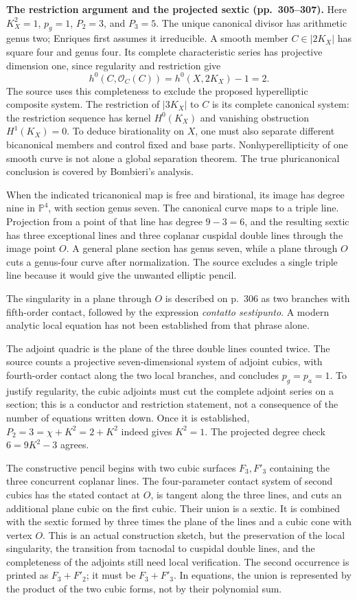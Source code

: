 \textbf{The restriction argument and the projected sextic (pp.~305--307).}
Here \(K_X^2=1\), \(p_g=1\), \(P_2=3\), and \(P_3=5\). The unique canonical divisor has arithmetic genus two; Enriques first assumes it irreducible. A smooth member \(C\in|2K_X|\) has square four and genus four. Its complete characteristic series has projective dimension one, since regularity and restriction give
\[
h^0(C,\mathcal O_C(C))=h^0(X,2K_X)-1=2.
\]
The source uses this completeness to exclude the proposed hyperelliptic composite system. The restriction of \(|3K_X|\) to \(C\) is its complete canonical system: the restriction sequence has kernel \(H^0(K_X)\) and vanishing obstruction \(H^1(K_X)=0\). To deduce birationality on \(X\), one must also separate different bicanonical members and control fixed and base parts. Nonhyperellipticity of one smooth curve is not alone a global separation theorem. The true pluricanonical conclusion is covered by Bombieri's analysis.

When the indicated tricanonical map is free and birational, its image has degree nine in \(\mathbb P^4\), with section genus seven. The canonical curve maps to a triple line. Projection from a point of that line has degree \(9-3=6\), and the resulting sextic has three exceptional lines and three coplanar cuspidal double lines through the image point \(O\). A general plane section has genus seven, while a plane through \(O\) cuts a genus-four curve after normalization. The source excludes a single triple line because it would give the unwanted elliptic pencil.

The singularity in a plane through \(O\) is described on p.~306 as two branches with fifth-order contact, followed by the expression \emph{contatto sestipunto}. A modern analytic local equation has not been established from that phrase alone.

The adjoint quadric is the plane of the three double lines counted twice. The source counts a projective seven-dimensional system of adjoint cubics, with fourth-order contact along the two local branches, and concludes \(p_g=p_a=1\). To justify regularity, the cubic adjoints must cut the complete adjoint series on a section; this is a conductor and restriction statement, not a consequence of the number of equations written down. Once it is established, \(P_2=3=\chi+K^2=2+K^2\) indeed gives \(K^2=1\). The projected degree check \(6=9K^2-3\) agrees.

The constructive pencil begins with two cubic surfaces \(F_3,F'_3\) containing the three concurrent coplanar lines. The four-parameter contact system of second cubics has the stated contact at \(O\), is tangent along the three lines, and cuts an additional plane cubic on the first cubic. Their union is a sextic. It is combined with the sextic formed by three times the plane of the lines and a cubic cone with vertex \(O\). This is an actual construction sketch, but the preservation of the local singularity, the transition from tacnodal to cuspidal double lines, and the completeness of the adjoints still need local verification. The second occurrence is printed as \(F_3+F'_2\); it must be \(F_3+F'_3\). In equations, the union is represented by the product of the two cubic forms, not by their polynomial sum.

